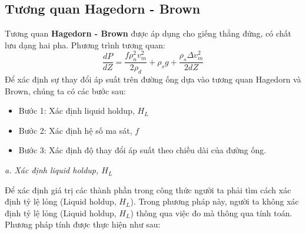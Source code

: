 \documentclass[12pt,a4paper]{report}
\begin{document}
\subsection{Tương quan Hagedorn - Brown}

Tương quan \textbf{Hagedorn - Brown} được áp dụng cho giếng thẳng đứng, có chất lưu dạng hai pha. Phương trình tương quan:
	\begin{equation}
		\dfrac{dP}{dZ} = \dfrac{f\rho_{n}^2v_{m}^2}{2\rho_d} + \rho_{s}g + \dfrac{\rho_{s}\Delta v_{m}^2}{2dZ}
	\end{equation}
Để xác định sự thay đổi áp suất trên đường ống dựa vào tương quan Hagedorn và Brown, chúng ta có các bước sau:
	\begin{itemize}
		\item Bước 1: Xác định liquid holdup, $H_L$ 
		\item Bước 2: Xác định hệ số ma sát, $f$
		\item Bước 3: Xác định độ thay đổi áp suất theo chiều dài của đường ống.
	\end{itemize}

\textit{a. Xác định liquid holdup, $H_L$}

Để xác định giá trị các thành phần trong công thức người ta phải tìm cách xác định tỷ lệ lỏng (Liquid holdup, $H_L$). Trong phương pháp này, người ta không xác định tỷ lệ lỏng (Liquid holdup, $H_L$) thông qua việc đo mà thông qua tính toán. Phương pháp tính được thực hiện như sau:
\end{document}
